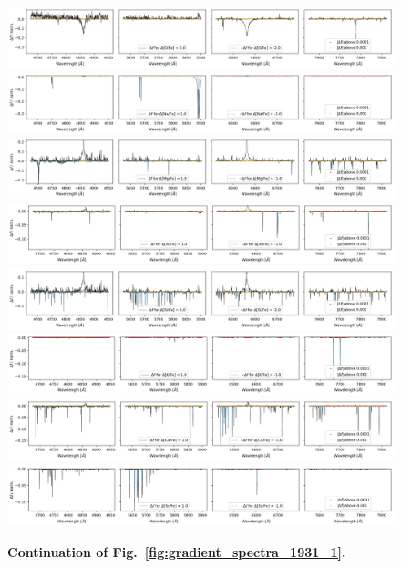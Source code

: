 \documentclass[
  journal=pasa,
  manuscript=research-paper, %
  year=2021,
  volume=37,
]{cup-journal}
\begin{document}
\begin{figure}[hbt!]
 \centering  
 \includegraphics[width=\textwidth]{figures/gradient_spectrum_1931_o_fe.png}
 \includegraphics[width=\textwidth]{figures/gradient_spectrum_1931_na_fe.png}
 \includegraphics[width=\textwidth]{figures/gradient_spectrum_1931_mg_fe.png}
 \includegraphics[width=\textwidth]{figures/gradient_spectrum_1931_al_fe.png}
 \includegraphics[width=\textwidth]{figures/gradient_spectrum_1931_si_fe.png}
 \includegraphics[width=\textwidth]{figures/gradient_spectrum_1931_k_fe.png}
 \includegraphics[width=\textwidth]{figures/gradient_spectrum_1931_ca_fe.png}
 \includegraphics[width=\textwidth]{figures/gradient_spectrum_1931_sc_fe.png}
 \caption{\textbf{Continuation of Fig.~\ref{fig:gradient_spectra_1931_1}.}} \label{fig:gradient_spectra_1931_2}
\end{figure}
\end{document}
